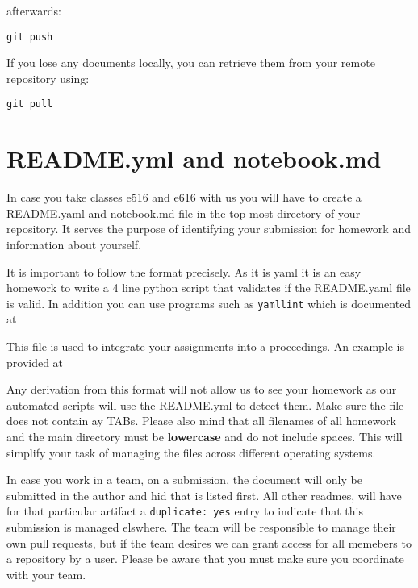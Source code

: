 afterwards:

\begin{verbatim}
git push
\end{verbatim}

If you lose any documents locally, you can retrieve them from your
remote repository using:

\begin{verbatim}
git pull
\end{verbatim}

\section{README.yml and notebook.md}

In case you take classes e516 and e616 with us you will have to create
a README.yaml and notebook.md file in the top most directory of your
repository. It serves the purpose of identifying your submission for
homework and information about yourself.

It is important to follow the format precisely. As it is yaml it is an
easy homework to write a 4 line python script that validates if the
README.yaml file is valid. In addition you can use programs such as
\verb|yamllint| which is documented at 


This file is used to integrate your assignments into a proceedings. An
example is provided at 


Any derivation from this format will not allow us to see your homework
as our automated scripts will use the README.yml to detect
them. Make sure the file does not
contain ay TABs.  Please also mind that all filenames of all homework
and the main directory must be \textbf{lowercase} and do not include
spaces. This will simplify your task of managing the files across
different operating systems.

In case you work in a team, on a submission, the document will only be
submitted in the author and hid that is listed first. All other
readmes, will have for that particular artifact a
\verb|duplicate: yes| entry to indicate that this submission is
managed elswhere. The team will be responsible to manage their own
pull requests, but if the team desires we can grant access for all
memebers to a repository by a user. Please be aware that you must make
sure you coordinate with your team.

